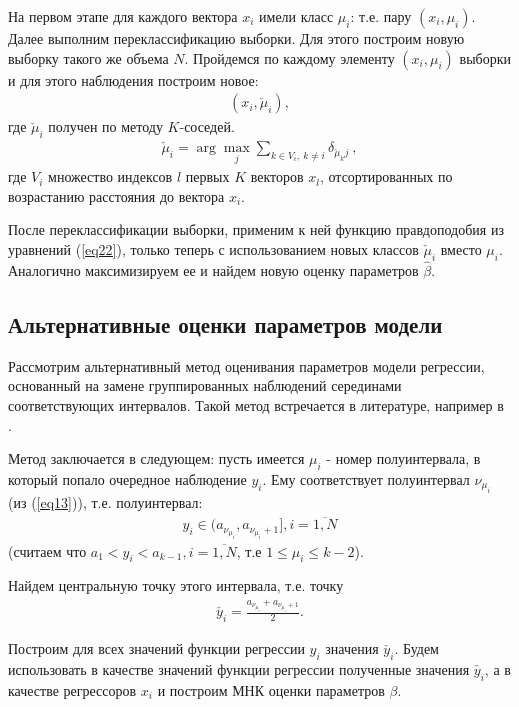 На первом этапе для каждого вектора $x_i$ имели класс $\mu_i$: т.е. пару $(x_i,\mu_i)$.
Далее выполним переклассификацию выборки. 
Для этого построим новую выборку такого же объема $N$.
Пройдемся по каждому элементу $(x_i, \mu_i)$ выборки и для этого наблюдения построим новое:
\begin{eqnarray}
    (x_i, \check{\mu}_i),
\end{eqnarray}
где $\check{\mu}_i$ получен по методу $K$-соседей.\hfill\break
\begin{eqnarray}
    \check{\mu}_i = \arg\max_j \sum_{k \in V_i,~k\neq i} \delta_{\check{\mu}_k j}~,
\end{eqnarray}
где $V_i$ множество индексов $l$ первых $K$ векторов $x_l$, отсортированных по возрастанию расстояния до вектора $x_i$.

После переклассификации выборки, применим к ней функцию правдоподобия из уравнений (\ref{eq22}), только теперь с использованием новых классов $\check{\mu}_i$ вместо $\mu_i$. 
Аналогично максимизируем ее и найдем новую оценку параметров $\hat{\beta}$.


\newpage
\subsection{Альтернативные оценки параметров модели}
Рассмотрим альтернативный метод оценивания параметров модели регрессии, основанный на замене группированных наблюдений серединами соответствующих интервалов. 
Такой метод встречается в литературе, например в \cite{interval_valued}.

Метод заключается в следующем:
пусть имеется $\mu_i$ - номер полуинтервала, в который попало очередное наблюдение $y_i$. Ему соответствует полуинтервал $\nu_{\mu_i}$ (из (\ref{eq13})), т.е. полуинтервал:
\begin{eqnarray}
    y_i\in (a_{\nu_{\mu_i}},a_{\nu_{\mu_i}+1}], i = \overline{1,N}
\end{eqnarray}
(считаем что $a_1<y_i<a_{k-1}, i=\overline{1,N}$, т.е $1\leq\mu_i\leq k-2$).

Найдем центральную точку этого интервала, т.е. точку
\begin{eqnarray}
    \check{y_i} = \frac{a_{\nu_{\mu_i}} + a_{\nu_{\mu_i}+1}}{2}.
\end{eqnarray}

Построим для всех значений функции регрессии $y_i$ значения $\check{y_i}$.
Будем использовать в качестве значений функции регрессии полученные значения $\check{y_i}$, а в качестве регрессоров $x_i$ и построим МНК оценки параметров $\beta$.

